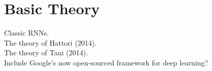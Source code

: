 
\chapter{Basic Theory}

Classic RNNs.
\\
The theory of Hattori (2014).
\\
The theory of Tani (2014).
\\
Include Google's now open-sourced framework for deep learning?
\\


\cleardoublepage